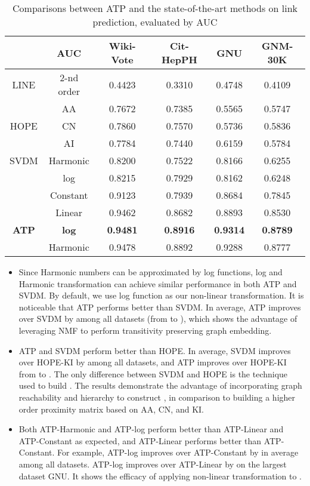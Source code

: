 \documentclass[letterpaper]{article} \usepackage{aaai19}  \usepackage{times}  \usepackage{helvet}  \usepackage{courier}  \usepackage{url}  \usepackage{graphicx}  \usepackage{booktabs} \usepackage{xcolor}
\begin{document}
\begin{table}
\centering
\small
\caption{Comparisons between ATP and the state-of-the-art methods on link prediction, evaluated by AUC}
\setlength\tabcolsep{2.75pt} \begin{tabular}{@{}c|c|cccc@{}} \toprule
 & AUC & Wiki-Vote & Cit-HepPH & GNU &  GNM-30K\\ \midrule
LINE & 2-nd order & 0.4423 & 0.3310 & 0.4748 &  0.4109 \\ \midrule
  & AA & 0.7672 & 0.7385 & 0.5565 & 0.5747\\
 HOPE & CN & 0.7860 & 0.7570 & 0.5736 & 0.5836\\
 & AI & 0.7784 & 0.7440 & 0.6159 &  0.5784\\ \midrule 
SVDM & Harmonic  & 0.8200 & 0.7522 & 0.8166  & 0.6255\\ 
    & log       &  0.8215	& 0.7929	& 0.8162	& 0.6248 \\ \midrule 
& Constant & 0.9123 & 0.7939 & 0.8684 &  0.7845\\
 & Linear & 0.9462 & 0.8682 & 0.8893 &  0.8530\\
 {\bf ATP} &{\bf log} & {\bf 0.9481} & {\bf 0.8916} & {\bf 0.9314}  & {\bf 0.8789}\\ 
& Harmonic & 0.9478 & 0.8892 & 0.9288  & 0.8777\\
 \bottomrule
\end{tabular}
\label{tab:hge_hope_comparison}
\end{table}

\begin{itemize}[leftmargin=0.4cm,noitemsep]
    \item Since Harmonic numbers can be approximated by log functions, log and Harmonic transformation can achieve similar performance in both ATP and SVDM. By default, we use log function as our non-linear transformation. It is noticeable that ATP performs better than SVDM. In average, ATP improves over SVDM by  among all datasets (from  to ), which shows the advantage of leveraging NMF to perform transitivity preserving graph embedding. 
    
    \item ATP and SVDM perform better than HOPE. In average, SVDM improves over HOPE-KI by  among all datasets, and ATP improves over HOPE-KI from  to . The only difference between SVDM and HOPE is the technique used to build . The results demonstrate the advantage of incorporating graph reachability and hierarchy to construct , in comparison to building a higher order proximity matrix based on AA, CN, and KI.
    
    \item Both ATP-Harmonic and ATP-log perform better than ATP-Linear and ATP-Constant as expected, and ATP-Linear performs better than ATP-Constant. For example, ATP-log improves over ATP-Constant by  in average among all datasets. ATP-log improves over ATP-Linear by  on the largest dataset GNU. It shows the efficacy of applying non-linear transformation to .

    
\end{itemize}
\end{document}
